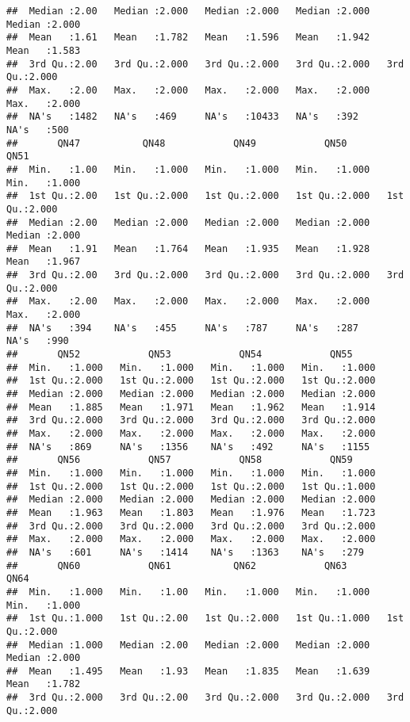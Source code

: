 \documentclass[
]{article}
\begin{document}
\begin{verbatim}
##  Median :2.00   Median :2.000   Median :2.000   Median :2.000   Median :2.000  
##  Mean   :1.61   Mean   :1.782   Mean   :1.596   Mean   :1.942   Mean   :1.583  
##  3rd Qu.:2.00   3rd Qu.:2.000   3rd Qu.:2.000   3rd Qu.:2.000   3rd Qu.:2.000  
##  Max.   :2.00   Max.   :2.000   Max.   :2.000   Max.   :2.000   Max.   :2.000  
##  NA's   :1482   NA's   :469     NA's   :10433   NA's   :392     NA's   :500    
##       QN47           QN48            QN49            QN50            QN51      
##  Min.   :1.00   Min.   :1.000   Min.   :1.000   Min.   :1.000   Min.   :1.000  
##  1st Qu.:2.00   1st Qu.:2.000   1st Qu.:2.000   1st Qu.:2.000   1st Qu.:2.000  
##  Median :2.00   Median :2.000   Median :2.000   Median :2.000   Median :2.000  
##  Mean   :1.91   Mean   :1.764   Mean   :1.935   Mean   :1.928   Mean   :1.967  
##  3rd Qu.:2.00   3rd Qu.:2.000   3rd Qu.:2.000   3rd Qu.:2.000   3rd Qu.:2.000  
##  Max.   :2.00   Max.   :2.000   Max.   :2.000   Max.   :2.000   Max.   :2.000  
##  NA's   :394    NA's   :455     NA's   :787     NA's   :287     NA's   :990    
##       QN52            QN53            QN54            QN55      
##  Min.   :1.000   Min.   :1.000   Min.   :1.000   Min.   :1.000  
##  1st Qu.:2.000   1st Qu.:2.000   1st Qu.:2.000   1st Qu.:2.000  
##  Median :2.000   Median :2.000   Median :2.000   Median :2.000  
##  Mean   :1.885   Mean   :1.971   Mean   :1.962   Mean   :1.914  
##  3rd Qu.:2.000   3rd Qu.:2.000   3rd Qu.:2.000   3rd Qu.:2.000  
##  Max.   :2.000   Max.   :2.000   Max.   :2.000   Max.   :2.000  
##  NA's   :869     NA's   :1356    NA's   :492     NA's   :1155   
##       QN56            QN57            QN58            QN59      
##  Min.   :1.000   Min.   :1.000   Min.   :1.000   Min.   :1.000  
##  1st Qu.:2.000   1st Qu.:2.000   1st Qu.:2.000   1st Qu.:1.000  
##  Median :2.000   Median :2.000   Median :2.000   Median :2.000  
##  Mean   :1.963   Mean   :1.803   Mean   :1.976   Mean   :1.723  
##  3rd Qu.:2.000   3rd Qu.:2.000   3rd Qu.:2.000   3rd Qu.:2.000  
##  Max.   :2.000   Max.   :2.000   Max.   :2.000   Max.   :2.000  
##  NA's   :601     NA's   :1414    NA's   :1363    NA's   :279    
##       QN60            QN61           QN62            QN63            QN64      
##  Min.   :1.000   Min.   :1.00   Min.   :1.000   Min.   :1.000   Min.   :1.000  
##  1st Qu.:1.000   1st Qu.:2.00   1st Qu.:2.000   1st Qu.:1.000   1st Qu.:2.000  
##  Median :1.000   Median :2.00   Median :2.000   Median :2.000   Median :2.000  
##  Mean   :1.495   Mean   :1.93   Mean   :1.835   Mean   :1.639   Mean   :1.782  
##  3rd Qu.:2.000   3rd Qu.:2.00   3rd Qu.:2.000   3rd Qu.:2.000   3rd Qu.:2.000  

\end{verbatim}
\end{document}
